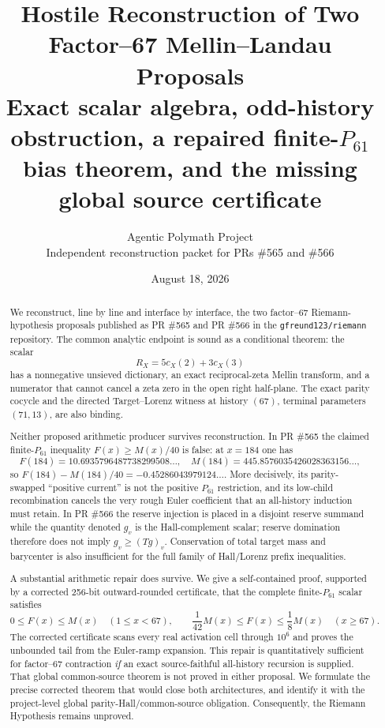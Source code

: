 \documentclass[11pt]{article}
\title{\textbf{Hostile Reconstruction of Two Factor--67 Mellin--Landau Proposals}\\[4pt]
\large Exact scalar algebra, odd-history obstruction, a repaired finite-$P_{61}$ bias theorem, and the missing global source certificate}
\author{Agentic Polymath Project\\Independent reconstruction packet for PRs \#565 and \#566}
\date{August 18, 2026}
\newcommand{\1}{\mathbf 1}
\begin{document}
\maketitle

\begin{abstract}
We reconstruct, line by line and interface by interface, the two factor--67 Riemann-hypothesis proposals published as PR \#565 and PR \#566 in the \texttt{gfreund123/riemann} repository.  The common analytic endpoint is sound as a conditional theorem: the scalar
\[
R_X=5c_X(2)+3c_X(3)
\]
has a nonnegative unsieved dictionary, an exact reciprocal-zeta Mellin transform, and a numerator that cannot cancel a zeta zero in the open right half-plane.  The exact parity cocycle and the directed Target--Lorenz witness at history $(67)$, terminal parameters $(71,13)$, are also binding.

Neither proposed arithmetic producer survives reconstruction.  In PR \#565 the claimed finite-$P_{61}$ inequality $F(x)\ge M(x)/40$ is false: at $x=184$ one has
\[
F(184)=10.6935796487738299508\ldots,
\quad
M(184)=445.8576035426028363156\ldots,
\]
so $F(184)-M(184)/40=-0.45286043979124\ldots$.  More decisively, its parity-swapped ``positive current'' is not the positive $P_{61}$ restriction, and its low-child recombination cancels the very rough Euler coefficient that an all-history induction must retain.  In PR \#566 the reserve injection is placed in a disjoint reserve summand while the quantity denoted $g_v$ is the Hall-complement scalar; reserve domination therefore does not imply $g_v\ge (Tg)_v$.  Conservation of total target mass and barycenter is also insufficient for the full family of Hall/Lorenz prefix inequalities.

A substantial arithmetic repair does survive.  We give a self-contained proof, supported by a corrected 256-bit outward-rounded certificate, that the complete finite-$P_{61}$ scalar satisfies
\[
0\le F(x)\le M(x)\quad(1\le x<67),
\qquad
\frac1{42}M(x)\le F(x)\le\frac18M(x)\quad(x\ge67).
\]
The corrected certificate scans every real activation cell through $10^6$ and proves the unbounded tail from the Euler-ramp expansion.  This repair is quantitatively sufficient for factor--67 contraction \emph{if} an exact source-faithful all-history recursion is supplied.  That global common-source theorem is not proved in either proposal.  We formulate the precise corrected theorem that would close both architectures, and identify it with the project-level global parity-Hall/common-source obligation.  Consequently, the Riemann Hypothesis remains unproved.
\end{abstract}
\end{document}
